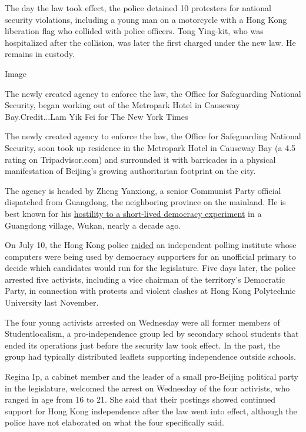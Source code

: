 The day the law took effect, the police detained 10 protesters for
national security violations, including a young man on a motorcycle with
a Hong Kong liberation flag who collided with police officers. Tong
Ying-kit, who was hospitalized after the collision, was later the first
charged under the new law. He remains in custody.

Image

The newly created agency to enforce the law, the Office for Safeguarding
National Security, began working out of the Metropark Hotel in Causeway
Bay.Credit...Lam Yik Fei for The New York Times

The newly created agency to enforce the law, the Office for Safeguarding
National Security, soon took up residence in the Metropark Hotel in
Causeway Bay (a 4.5 rating on Tripadvisor.com) and surrounded it with
barricades in a physical manifestation of Beijing's growing
authoritarian footprint on the city.

The agency is headed by Zheng Yanxiong, a senior Communist Party
official dispatched from Guangdong, the neighboring province on the
mainland. He is best known for his
\href{https://www.nytimes3xbfgragh.onion/2011/12/31/world/asia/chinese-official-wang-yang-tests-new-political-approach.html}{hostility
to a short-lived democracy experiment} in a Guangdong village, Wukan,
nearly a decade ago.

On July 10, the Hong Kong police
\href{https://www.nytimes3xbfgragh.onion/2020/07/10/world/asia/hong-kong-police-raid-pollster.html}{raided}
an independent polling institute whose computers were being used by
democracy supporters for an unofficial primary to decide which
candidates would run for the legislature. Five days later, the police
arrested five activists, including a vice chairman of the territory's
Democratic Party, in connection with protests and violent clashes at
Hong Kong Polytechnic University last November.

The four young activists arrested on Wednesday were all former members
of Studentlocalism, a pro-independence group led by secondary school
students that ended its operations just before the security law took
effect. In the past, the group had typically distributed leaflets
supporting independence outside schools.

Regina Ip, a cabinet member and the leader of a small pro-Beijing
political party in the legislature, welcomed the arrest on Wednesday of
the four activists, who ranged in age from 16 to 21. She said that their
postings showed continued support for Hong Kong independence after the
law went into effect, although the police have not elaborated on what
the four specifically said.

